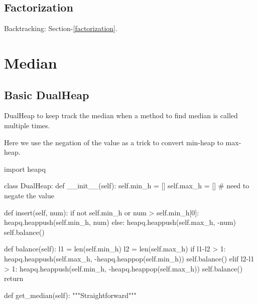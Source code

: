\subsection{Factorization}
Backtracking: Section-\ref{factorization}.

\section{Median}
\subsection{Basic DualHeap}
DualHeap to keep track the median when a method to find median is called multiple times.

Here we use the negation of the value as a trick to convert min-heap to max-heap.
\begin{python}
import heapq

class DualHeap:
  def __init__(self):
    self.min_h = []
    self.max_h = []  # need to negate the value 

  def insert(self, num):
    if not self.min_h or num > self.min_h[0]:
      heapq.heappush(self.min_h, num)
    else:
      heapq.heappush(self.max_h, -num)
    self.balance()

  def balance(self):
    l1 = len(self.min_h)
    l2 = len(self.max_h)
    if l1-l2 > 1:
      heapq.heappush(self.max_h, 
                     -heapq.heappop(self.min_h))
      self.balance()
    elif l2-l1 > 1:
      heapq.heappush(self.min_h, 
                     -heapq.heappop(self.max_h))
      self.balance()
    return

  def get_median(self):
    """Straightforward"""
\end{python}

